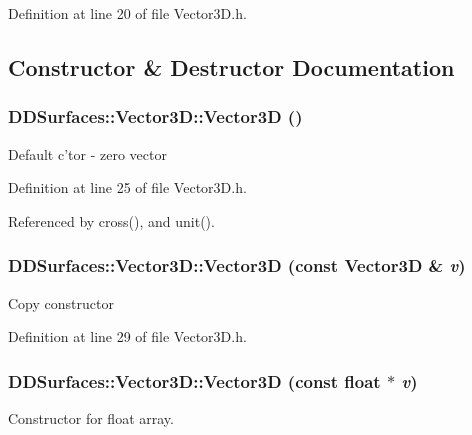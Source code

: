 Definition at line 20 of file Vector3D.h.

\subsection{Constructor \& Destructor Documentation}
\hypertarget{class_d_d_surfaces_1_1_vector3_d_a73ba737984a707d10941c463359449f5}{
\subsubsection[{Vector3D}]{\setlength{\rightskip}{0pt plus 5cm}DDSurfaces::Vector3D::Vector3D ()}}
\label{class_d_d_surfaces_1_1_vector3_d_a73ba737984a707d10941c463359449f5}
Default c'tor -\/ zero vector 

Definition at line 25 of file Vector3D.h.

Referenced by cross(), and unit().\hypertarget{class_d_d_surfaces_1_1_vector3_d_aca002b4e7f684e42be118701f5f36a24}{
\subsubsection[{Vector3D}]{\setlength{\rightskip}{0pt plus 5cm}DDSurfaces::Vector3D::Vector3D (const {\bf Vector3D} \& {\em v})}}
\label{class_d_d_surfaces_1_1_vector3_d_aca002b4e7f684e42be118701f5f36a24}
Copy constructor 

Definition at line 29 of file Vector3D.h.\hypertarget{class_d_d_surfaces_1_1_vector3_d_a66b1e2e00762d97d32977463936965aa}{
\subsubsection[{Vector3D}]{\setlength{\rightskip}{0pt plus 5cm}DDSurfaces::Vector3D::Vector3D (const float $\ast$ {\em v})}}
\label{class_d_d_surfaces_1_1_vector3_d_a66b1e2e00762d97d32977463936965aa}
Constructor for float array. 

